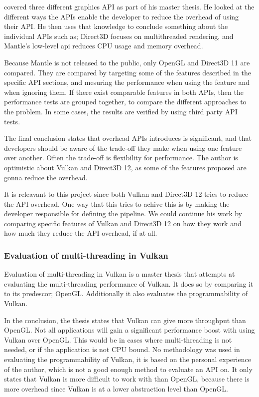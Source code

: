 \citet{dobersberger_2015_reducing} covered three different graphics \gls{API} as part of his master thesis. 
He looked at the different ways the \glspl{API} enable the developer to reduce the overhead of using their \gls{API}. 
He then uses that knowledge to conclude something about the individual \glspl{API} such as; Direct3D focuses on multithreaded rendering, and Mantle's low-level api reduces \gls{CPU} usage and memory overhead.

Because Mantle is not released to the public, only OpenGL and Direct3D 11 are compared.
They are compared by targeting some of the features described in the specific \gls{API} sections, and mesuring the performance when using the feature and when ignoring them.
If there exist comparable features in both \glspl{API}, then the performance tests are grouped together, to compare the different approaches to the problem.
In some cases, the results are verified by using third party \gls{API} tests.

The final conclusion states that overhead \glspl{API} introduces is significant, and that developers should be aware of the trade-off they make when using one feature over another.
Often the trade-off is flexibility for performance.
The author is optimistic about Vulkan and Direct3D 12, as some of the features proposed are gonna reduce the overhead.

It is releavant to this project  since both Vulkan and Direct3D 12 tries to reduce the \gls{API} overhead.
One way that this tries to achive this is by making the developer responsible for defining the pipeline.
We could continue his work by comparing specific features of Vulkan and Direct3D 12 on how they work and how much they reduce the \gls{API} overhead, if at all.

\subsubsection{Evaluation of multi-threading in Vulkan}

Evaluation of multi-threading in Vulkan \cite{blackert_2016_evaluation} is a master thesis that attempts at evaluating the multi-threading performance of Vulkan. It does so by comparing it to its predescor; OpenGL. 
Additionally it also evaluates the programmability of Vulkan. 

In the conclusion, the thesis states that Vulkan can give more throughput than OpenGL. 
Not all applications will gain a significant performance boost with using Vulkan over OpenGL. 
This would be in cases where multi-threading is not needed, or if the application is not CPU bound. 
No methodology was used in evaluating the programmability of Vulkan, it is based on the personal experience of the author, which is not a good enough method to evaluate an \gls{API} on. 
It only states that Vulkan is more difficult to work with than OpenGL, because there is more overhead since Vulkan is at a lower abstraction level than OpenGL. 

